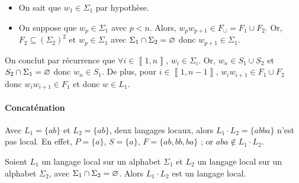 \begin{prv}
\begin{itemize}
\begin{itemize}
					\begin{itemize}
						\item On sait que $w_1 \in \Sigma_1$\/ par hypothèse.
						\item On suppose que $w_p \in \Sigma_1$\/ avec $p < n$.
							Alors, $w_p w_{p+1} \in F_\cup = F_1 \cup F_2$.
							Or, $F_2 \subseteq (\Sigma_2)^2$\/ et $w_p \in \Sigma_1$\/ avec $\Sigma_1 \cap \Sigma_2 = \varnothing$\/ donc $w_{p+1} \in \Sigma_1$.
					\end{itemize}
					On conclut par récurrence que $\forall i \in \left\llbracket 1,n \right\rrbracket$, $w_i \in \Sigma_i$.
					Or, $w_n \in S_1 \cup S_2$\/ et $S_2 \cap \Sigma_1 = \varnothing$\/ donc $w_n \in S_1$.
					De plus, pour $i \in \left\llbracket 1,n-1 \right\rrbracket$, $w_iw_{i+1} \in F_1 \cup F_2$\/ donc $w_i w_{i+1} \in F_1$\/ et donc $w \in L_1$.
			\end{itemize}
	\end{itemize}
\end{prv}

\paragraph{Concaténation}

\begin{cexm}
	Avec $L_1 = \{ab\}$\/ et $L_2 = \{ab\}$, deux langages locaux, alors $L_1 \cdot L_2 = \{abba\}$\/ n'est pas local. En effet, $P = \{a\}$, $S = \{a\}$, $F = \{ab, bb, ba\}$\/ ; or $aba \not\in  L_1 \cdot L_2$.
\end{cexm}

\begin{prop}
	Soient $L_1$\/ un langage local sur un alphabet $\Sigma_1$ et $L_2$\/ un langage local sur un alphabet $\Sigma_2$, avec $\Sigma_1 \cap \Sigma_2 = \varnothing$.
	Alors $L_1 \cdot L_2$\/ est un langage local.
\end{prop}

